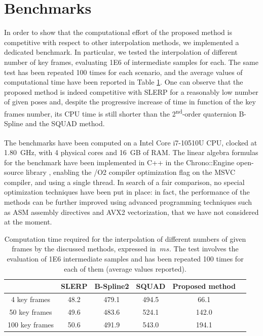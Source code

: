 \section{Benchmarks}
\label{sec:benchmarks}
In order to show that the computational effort of the proposed method is competitive with respect to other interpolation methods, we implemented a dedicated benchmark. In particular, we tested the interpolation of different number of key frames, evaluating 1E6 of intermediate samples for each. The same test has been repeated 100 times for each scenario, and the average values of computational time have been reported in Table \ref{tab:benchmark_time}. One can observe that the proposed method is indeed competitive with SLERP for a reasonably low number of given poses and, despite the progressive increase of time in function of the key frames number, its CPU time is still shorter than the 2\textsuperscript{nd}-order quaternion B-Spline and the SQUAD method. 

The benchmarks have been computed on a Intel\textsuperscript{\textregistered} Core\textsuperscript{\texttrademark} i7-10510U CPU, clocked at \SI{1.80}{GHz}, with 4 physical cores and \SI{16}{GB} of RAM. The linear algebra formulas for the benchmark have been implemented in C++ in the Chrono::Engine open-source library \cite{tasora2015chrono}, enabling the /O2 compiler optimization flag on the MSVC compiler, and using a single thread. In search of a fair comparison, no special optimization techniques have been put in place: in fact, the performance of the methods can be further improved using advanced programming techniques such as ASM assembly directives and AVX2 vectorization, that we have not considered at the moment.

\begin{table}[tp]
	\centering
	\caption{Computation time required for the interpolation of different numbers of given frames by the discussed methods, expressed in $\SI{}{ms}$. The test involves the evaluation of 1E6 intermediate samples and has been repeated 100 times for each of them (average values reported).}
	\setlength{\tabcolsep}{3pt}
	\begin{tabular}{c|ccccc}
		\toprule
		& SLERP & B-Spline2 & SQUAD & Proposed method \\
		\midrule
        4 key frames & 48.2 & 479.1 & 494.5 & 66.1 \\
        50 key frames & 49.6 & 483.6 & 524.1 & 142.0 \\
        100 key frames & 50.6 & 491.9 & 543.0 & 194.1 \\
		\bottomrule
	\end{tabular}
	\label{tab:benchmark_time}
\end{table}

